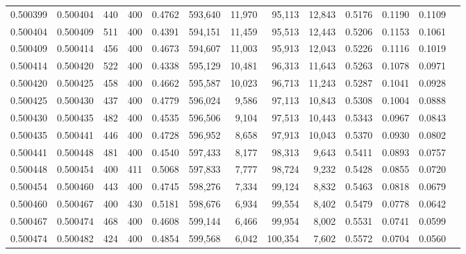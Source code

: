 \begin{tabular}{rrrrrrrrrrrrr}
0.500399 & 0.500404 &    440 & 400 &                                     0.4762 & 593,640 &  11,970 &  95,113 &  12,843 & 0.5176 & 0.1190 & 0.1109 \\
0.500404 & 0.500409 &    511 & 400 &                                     0.4391 & 594,151 &  11,459 &  95,513 &  12,443 & 0.5206 & 0.1153 & 0.1061 \\
0.500409 & 0.500414 &    456 & 400 &                                     0.4673 & 594,607 &  11,003 &  95,913 &  12,043 & 0.5226 & 0.1116 & 0.1019 \\
0.500414 & 0.500420 &    522 & 400 &                                     0.4338 & 595,129 &  10,481 &  96,313 &  11,643 & 0.5263 & 0.1078 & 0.0971 \\
0.500420 & 0.500425 &    458 & 400 &                                     0.4662 & 595,587 &  10,023 &  96,713 &  11,243 & 0.5287 & 0.1041 & 0.0928 \\
0.500425 & 0.500430 &    437 & 400 &                                     0.4779 & 596,024 &   9,586 &  97,113 &  10,843 & 0.5308 & 0.1004 & 0.0888 \\
0.500430 & 0.500435 &    482 & 400 &                                     0.4535 & 596,506 &   9,104 &  97,513 &  10,443 & 0.5343 & 0.0967 & 0.0843 \\
0.500435 & 0.500441 &    446 & 400 &                                     0.4728 & 596,952 &   8,658 &  97,913 &  10,043 & 0.5370 & 0.0930 & 0.0802 \\
0.500441 & 0.500448 &    481 & 400 &                                     0.4540 & 597,433 &   8,177 &  98,313 &   9,643 & 0.5411 & 0.0893 & 0.0757 \\
0.500448 & 0.500454 &    400 & 411 &                                     0.5068 & 597,833 &   7,777 &  98,724 &   9,232 & 0.5428 & 0.0855 & 0.0720 \\
0.500454 & 0.500460 &    443 & 400 &                                     0.4745 & 598,276 &   7,334 &  99,124 &   8,832 & 0.5463 & 0.0818 & 0.0679 \\
0.500460 & 0.500467 &    400 & 430 &                                     0.5181 & 598,676 &   6,934 &  99,554 &   8,402 & 0.5479 & 0.0778 & 0.0642 \\
0.500467 & 0.500474 &    468 & 400 &                                     0.4608 & 599,144 &   6,466 &  99,954 &   8,002 & 0.5531 & 0.0741 & 0.0599 \\
0.500474 & 0.500482 &    424 & 400 &                                     0.4854 & 599,568 &   6,042 & 100,354 &   7,602 & 0.5572 & 0.0704 & 0.0560 \\

\end{tabular}
